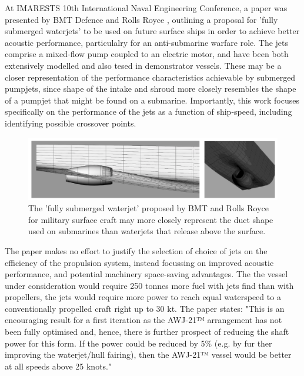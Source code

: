 \documentclass{article}\usepackage[]{graphicx}\usepackage[]{color}
\begin{document}
At IMARESTS 10th International Naval Engineering Conference, a paper was presented by BMT Defence and Rolls Royce \parencite{giles2010}, outlining a proposal for 'fully submerged waterjets' to be used on future surface ships in order to achieve better acoustic performance, particulalry for an anti-submarine warfare role. The jets comprise a mixed-flow pump coupled to an electric motor, and have been both extensively modelled and also tesed in demonstrator vessels.  These may be a closer representation of the performance characteristics achievable by submerged pumpjets, since shape of the intake and shroud more closely resembles the shape of a pumpjet that might be found on a submarine.  Importantly, this work focuses specifically on the performance of the jets as a function of ship-speed, including identifying possible crossover points.

\begin{figure}
\includegraphics[width=\textwidth]{BMTShape.png}
\caption{The 'fully submerged waterjet' proposed by BMT and Rolls Royce for military surface craft may more closely represent the duct shape used on submarines than waterjets that release above the surface. \parencite{giles2010}}
\label{fig:BMTShape.png}
\end{figure}

The paper makes no effort to justify the selection of choice of jets on the efficiency of the propulsion system, instead focussing on improved acoustic performance, and potential machinery space-saving advantages.  The the vessel under consideration would require 250 tonnes more fuel with jets find than with propellers, the jets would require more power to reach equal waterspeed to a conventionally propelled craft right up to 30 kt. The paper states: "This is an encouraging result for a first iteration as the AWJ-21™ arrangement has not been fully optimised and, hence, there is further prospect of reducing the shaft power for this form. If the power could be reduced by 5\% (e.g. by fur ther improving the waterjet/hull fairing), then the AWJ-21™ vessel would be better at all speeds above 25 knots." \parencite{giles2010}
\end{document}
